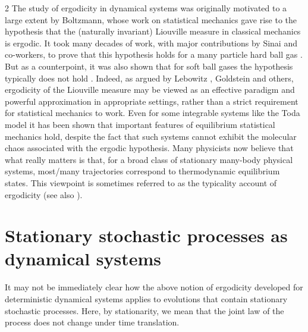 \documentclass[11pt]{article}
\begin{document}
\begin{multicols}{2}
The study of ergodicity in dynamical systems was originally motivated to a large extent by Boltzmann, whose work on statistical mechanics gave rise to the hypothesis that the (naturally invariant) Liouville measure in classical mechanics is ergodic. 
It took many decades of work, with major contributions by Sinai and co-workers, to prove that this hypothesis holds for a many particle hard ball gas \cite{Simanyi2003}. But as a counterpoint, it was also shown that for soft ball gases the hypothesis typically does not hold \cite{TuraevRomKedar1998}.
Indeed, as argued by Lebowitz \cite{lebowitz1993boltzmann}, Goldstein \cite{goldstein2001boltzmann} and others, ergodicity of the Liouville measure may be viewed as an effective paradigm and powerful approximation in appropriate settings, rather than a strict requirement for statistical mechanics to work. 
Even for some integrable systems like the Toda model \cite{LucenteEtAl_KhinchinErgodicity} it has been shown that important features of equilibrium statistical mechanics hold, 
despite the fact that such systems cannot exhibit the molecular chaos associated with the ergodic hypothesis.
Many physicists now believe that what really matters is that, for a broad class of stationary many-body physical systems, most/many trajectories correspond to thermodynamic equilibrium states.
This viewpoint is sometimes referred to as the typicality account of ergodicity
(see also \cite{Reichert_StationarityTypicalityErgodicity}).



\section{Stationary stochastic processes as dynamical systems}
\label{sec-stochastic-DS}
It may not be immediately clear how the above notion of ergodicity developed for deterministic dynamical systems applies to evolutions that contain stationary stochastic processes. Here, by stationarity, we mean that the joint law of the process does not change under time translation.


\end{multicols}
\end{document}
